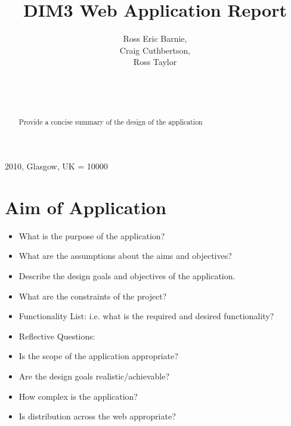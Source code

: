 \documentclass{sig-alt-release2}
\begin{document}
\newcommand{\todo}[1]{\textcolor{red}{#1}}
\def\newblock{\hskip .11em plus .33em minus .07em}

 {2010, Glasgow, UK} 
\widowpenalty = 10000

\title{DIM3 Web Application Report}

\author{
\alignauthor
Ross Eric Barnie, \\
Craig Cuthbertson, \\
Ross Taylor \\
\\
\\
\\
}
\maketitle

\begin{abstract}
Provide a concise summary of the design of the application

\end{abstract}

\section{Aim of Application}
\begin{itemize}
\item	What is the purpose of the application?
\item	What are the assumptions about the aims and objectives?
\item	Describe the design goals and objectives of the application.
\item	What are the constraints of the project?
\item	Functionality List: i.e. what is the required and desired functionality?
\item	Reflective Questions: 
\item	Is the scope of the application appropriate? 
\item	Are the design goals realistic/achievable? 
\item	How complex is the application? 
\item	Is distribution across the web appropriate? 
\end{itemize}
\end{document}
